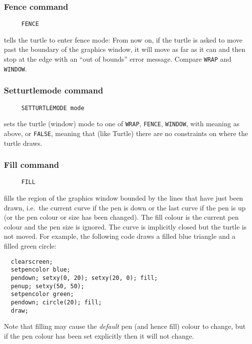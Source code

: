 \subsubsection*{Fence command}
\begin{verbatim}
     FENCE
\end{verbatim}
tells the turtle to enter fence mode: From now on, if the turtle is
asked to move past the boundary of the graphics window, it will move
as far as it can and then stop at the edge with an ``out of bounds''
error message.  Compare \texttt{WRAP} and \texttt{WINDOW}.

\subsubsection*{Setturtlemode command}
\begin{verbatim}
     SETTURTLEMODE mode
\end{verbatim}
sets the turtle (window) mode to one of \texttt{WRAP}, \texttt{FENCE},
\texttt{WINDOW}, with meaning as above, or \texttt{FALSE}, meaning
that (like Turtle) there are no constraints on where the turtle draws.

\subsubsection*{Fill command}
\begin{verbatim}
     FILL
\end{verbatim}
fills the region of the graphics window bounded by the lines that have
just been drawn, i.e.\ the current curve if the pen is down or the
last curve if the pen is up (or the pen colour or size has been
changed).  The fill colour is the current pen colour and the pen size
is ignored.  The curve is implicitly closed but the turtle is not
moved.  For example, the following code draws a filled blue triangle
and a filled green circle:
\begin{verbatim}
  clearscreen;
  setpencolor blue;
  pendown; setxy(0, 20); setxy(20, 0); fill;
  penup; setxy(50, 50);
  setpencolor green;
  pendown; circle(20); fill;
  draw;
\end{verbatim}
Note that filling may cause the \emph{default} pen (and hence fill)
colour to change, but if the pen colour has been set explicitly then
it will not change.

